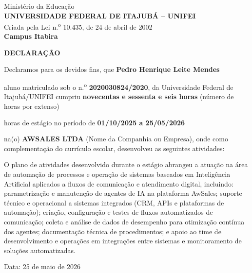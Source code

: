 \documentclass[12pt,a4paper]{article}
\begin{document}
\begin{center}
{\small
Ministério da Educação\\
\textbf{UNIVERSIDADE FEDERAL DE ITAJUBÁ -- UNIFEI}\\
Criada pela Lei n.\textsuperscript{o} 10.435, de 24 de abril de 2002\\
\textbf{Campus Itabira}
}
\end{center}

\vspace{1cm}

\begin{center}
{\Large\bfseries DECLARAÇÃO}
\end{center}

\vspace{0.6cm}

\noindent Declaramos para os devidos fins, que \textbf{Pedro Henrique Leite Mendes}

\noindent aluno matriculado sob o n.\textsuperscript{o} \textbf{2020030824/2020}, da Universidade Federal de Itajubá/UNIFEI cumpriu \textbf{novecentas e sessenta e seis horas} (número de horas por extenso)

\noindent horas de estágio no período de \textbf{01/10/2025 a 25/05/2026}

\noindent na(o) \textbf{AWSALES LTDA} (Nome da Companhia ou Empresa), onde como complementação do currículo escolar, desenvolveu as seguintes atividades:

\vspace{0.4cm}

\noindent O plano de atividades desenvolvido durante o estágio abrangeu a atuação na área de automação de processos e operação de sistemas baseados em Inteligência Artificial aplicados a fluxos de comunicação e atendimento digital, incluindo: parametrização e manutenção de agentes de IA na plataforma AwSales; suporte técnico e operacional a sistemas integrados (CRM, APIs e plataformas de automação); criação, configuração e testes de fluxos automatizados de comunicação; coleta e análise de dados de desempenho para otimização contínua dos agentes; documentação técnica de procedimentos; e apoio ao time de desenvolvimento e operações em integrações entre sistemas e monitoramento de soluções automatizadas.

\vspace{0.6cm}

\noindent Data: 25 de maio de 2026

\vspace{1.2cm}
\end{document}
